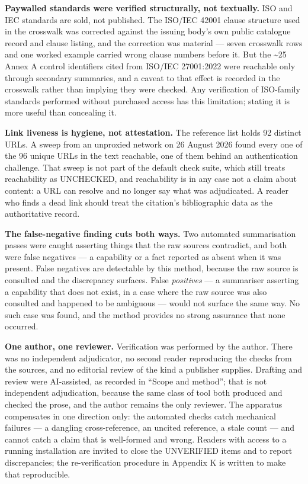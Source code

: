 \documentclass[11pt,a4paper,twoside,openany]{book}
\begin{document}
\textbf{Paywalled standards were verified structurally, not textually.} ISO and IEC standards are sold, not published. The ISO/IEC 42001 clause structure used in the crosswalk was corrected against the issuing body's own public catalogue record and clause listing, and the correction was material — seven crosswalk rows and one worked example carried wrong clause numbers before it. But the \textasciitilde{}25 Annex A control identifiers cited from ISO/IEC 27001:2022 were reachable only through secondary summaries, and a caveat to that effect is recorded in the crosswalk rather than implying they were checked. Any verification of ISO-family standards performed without purchased access has this limitation; stating it is more useful than concealing it.


\textbf{Link liveness is hygiene, not attestation.} The reference list holds 92 distinct URLs. A sweep from an unproxied network on 26 August 2026 found every one of the 96 unique URLs in the text reachable, one of them behind an authentication challenge. That sweep is not part of the default check suite, which still treats reachability as UNCHECKED, and reachability is in any case not a claim about content: a URL can resolve and no longer say what was adjudicated. A reader who finds a dead link should treat the citation's bibliographic data as the authoritative record.


\textbf{The false-negative finding cuts both ways.} Two automated summarisation passes were caught asserting things that the raw sources contradict, and both were false negatives — a capability or a fact reported as absent when it was present. False negatives are detectable by this method, because the raw source is consulted and the discrepancy surfaces. False \emph{positives} — a summariser asserting a capability that does not exist, in a case where the raw source was also consulted and happened to be ambiguous — would not surface the same way. No such case was found, and the method provides no strong assurance that none occurred.


\textbf{One author, one reviewer.} Verification was performed by the author. There was no independent adjudicator, no second reader reproducing the checks from the sources, and no editorial review of the kind a publisher supplies. Drafting and review were AI-assisted, as recorded in “Scope and method”; that is not independent adjudication, because the same class of tool both produced and checked the prose, and the author remains the only reviewer. The apparatus compensates in one direction only: the automated checks catch mechanical failures — a dangling cross-reference, an uncited reference, a stale count — and cannot catch a claim that is well-formed and wrong. Readers with access to a running installation are invited to close the UNVERIFIED items and to report discrepancies; the re-verification procedure in Appendix K is written to make that reproducible.
\end{document}
